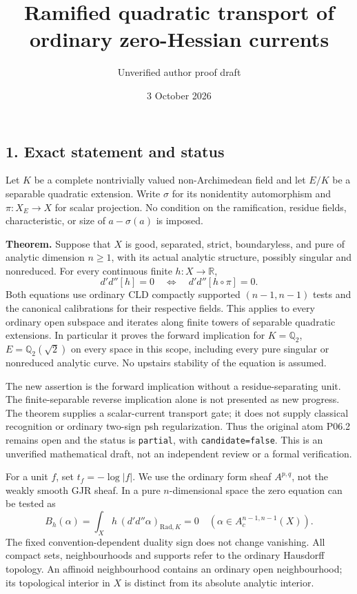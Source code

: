 \documentclass[
  11pt,
]{article}
\title{Ramified quadratic transport of ordinary zero-Hessian currents}
\author{Unverified author proof draft}
\date{3 October 2026}
\begin{document}
\maketitle

\subsection{1. Exact statement and
status}\label{exact-statement-and-status}

Let \(K\) be a complete nontrivially valued non-Archimedean field and
let \(E/K\) be a separable quadratic extension. Write \(\sigma\) for its
nonidentity automorphism and \(\pi:X_E\to X\) for scalar projection. No
condition on the ramification, residue fields, characteristic, or size
of \(a-\sigma(a)\) is imposed.

\textbf{Theorem.} Suppose that \(X\) is good, separated, strict,
boundaryless, and pure of analytic dimension \(n\geq1\), with its actual
analytic structure, possibly singular and nonreduced. For every
continuous finite \(h:X\to\mathbb R\), \[
 d'd''[h]=0\quad\Longleftrightarrow\quad
 d'd''[h\circ\pi]=0.                                      \tag{1}
\] Both equations use ordinary CLD compactly supported \((n-1,n-1)\)
tests and the canonical calibrations for their respective fields. This
applies to every ordinary open subspace and iterates along finite towers
of separable quadratic extensions. In particular it proves the forward
implication for \(K=\mathbb Q_2\), \(E=\mathbb Q_2(\sqrt2)\) on every
space in this scope, including every pure singular or nonreduced
analytic curve. No upstairs stability of the equation is assumed.

The new assertion is the forward implication without a
residue-separating unit. The finite-separable reverse implication alone
is not presented as new progress. The theorem supplies a scalar-current
transport gate; it does not supply classical recognition or ordinary
two-sign psh regularization. Thus the original atom P06.2 remains open
and the status is \texttt{partial}, with \texttt{candidate=false}. This
is an unverified mathematical draft, not an independent review or a
formal verification.

For a unit \(f\), set \(t_f=-\log|f|\). We use the ordinary form sheaf
\(A^{p,q}\), not the weakly smooth GJR sheaf. In a pure
\(n\)-dimensional space the zero equation can be tested as \[
 B_h(\alpha)=\int_X h\,(d'd''\alpha)_{\mathrm{Rad},K}=0
 \quad(\alpha\in A_c^{n-1,n-1}(X)).                         \tag{2}
\] The fixed convention-dependent duality sign does not change
vanishing. All compact sets, neighbourhoods and supports refer to the
ordinary Hausdorff topology. An affinoid neighbourhood contains an
ordinary open neighbourhood; its topological interior in \(X\) is
distinct from its absolute analytic interior.
\end{document}
